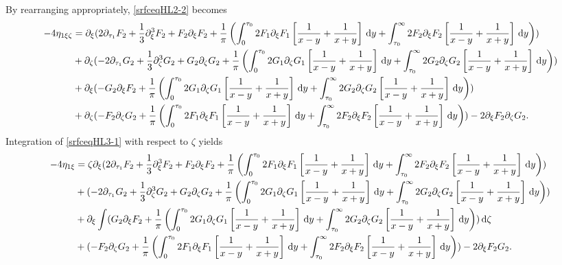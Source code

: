 \documentclass[10pt,reqno,oneside,a4paper, landscape]{article}
\begin{document}
By rearranging appropriately, \eqref{srfceqHL2-2} becomes
\begin{equation}\label{srfceqHL3-2}
\begin{aligned}
- 4\eta_{1\xi \zeta} &= \partial_\xi (2 \partial_{\tau_1}F_2 + \frac{1}{3} \partial_\xi^3 F_2 + F_2\partial_\xi F_2 + \frac{1}{\pi} \left( \int_0^{\tau_0} 2 F_1  \partial_\xi F_1 \left[ \frac{1}{x-y} + \frac{1}{x+y} \right] \,\mathrm{d} y +\int_{\tau_0}^\infty 2 F_2 \partial_\xi F_2\left[ \frac{1}{x-y} + \frac{1}{x+y} \right] \,\mathrm{d} y \right))  \\
&+ \partial_\zeta(- 2 \partial_{\tau_1} G_2 +  \frac{1}{3} \partial_\zeta^3 G_2+ G_2 \partial_{\zeta} G_2 + \frac{1}{\pi} \left( \int_0^{\tau_0}  2 G_1 \partial_\zeta G_1 \left[ \frac{1}{x-y} + \frac{1}{x+y} \right] \,\mathrm{d} y +\int_{\tau_0}^\infty 2 G_2 \partial_\zeta G_2 \left[ \frac{1}{x-y} + \frac{1}{x+y} \right] \,\mathrm{d} y \right)) \\
&+ \partial_{\xi}(-G_2 \partial_\xi F_2 + \frac{1}{\pi} \left( \int_0^{\tau_0} 2 G_1 \partial_\zeta G_1 \left[ \frac{1}{x-y} + \frac{1}{x+y} \right] \,\mathrm{d} y +\int_{\tau_0}^\infty 2 G_2 \partial_\zeta G_2 \left[ \frac{1}{x-y} + \frac{1}{x+y} \right] \,\mathrm{d} y \right) ) \\
&+ \partial_{\zeta}( - F_2\partial_\zeta G_2+ \frac{1}{\pi} \left( \int_0^{\tau_0} 2 F_1  \partial_\xi F_1 \left[ \frac{1}{x-y} + \frac{1}{x+y} \right] \,\mathrm{d} y +\int_{\tau_0}^\infty 2 F_2 \partial_\xi F_2  \left[ \frac{1}{x-y} + \frac{1}{x+y} \right] \,\mathrm{d} y \right)) - 2 \partial_\xi F_2 \partial_\zeta G_2. 
\end{aligned}
\end{equation}
Integration of \eqref{srfceqHL3-1} with respect to $\zeta$ yields
\begin{equation}
\begin{aligned}
- 4\eta_{1\xi} &= \zeta \partial_\xi (2 \partial_{\tau_1}F_2 + \frac{1}{3} \partial_\xi^3 F_2 + F_2\partial_\xi F_2 + \frac{1}{\pi} \left( \int_0^{\tau_0} 2 F_1  \partial_\xi F_1 \left[ \frac{1}{x-y} + \frac{1}{x+y} \right] \,\mathrm{d} y +\int_{\tau_0}^\infty 2 F_2 \partial_\xi F_2\left[ \frac{1}{x-y} + \frac{1}{x+y} \right] \,\mathrm{d} y \right))  \\
&+(- 2 \partial_{\tau_1} G_2 +  \frac{1}{3} \partial_\zeta^3 G_2+ G_2 \partial_{\zeta} G_2  + \frac{1}{\pi} \left( \int_0^{\tau_0}  2 G_1 \partial_\zeta G_1 \left[ \frac{1}{x-y} + \frac{1}{x+y} \right] \,\mathrm{d} y +\int_{\tau_0}^\infty 2 G_2 \partial_\zeta G_2 \left[ \frac{1}{x-y} + \frac{1}{x+y} \right] \,\mathrm{d} y \right)) \\
&+ \partial_{\xi}\int (G_2 \partial_\xi F_2 + \frac{1}{\pi} \left( \int_0^{\tau_0} 2 G_1 \partial_\zeta G_1 \left[ \frac{1}{x-y} + \frac{1}{x+y} \right] \,\mathrm{d} y +\int_{\tau_0}^\infty 2 G_2 \partial_\zeta G_2 \left[ \frac{1}{x-y} + \frac{1}{x+y} \right] \,\mathrm{d} y \right) )\,\mathrm{d} \zeta \\
&+(-F_2\partial_\zeta G_2 + \frac{1}{\pi} \left( \int_0^{\tau_0} 2 F_1  \partial_\xi F_1 \left[ \frac{1}{x-y} + \frac{1}{x+y} \right] \,\mathrm{d} y +\int_{\tau_0}^\infty 2 F_2 \partial_\xi F_2  \left[ \frac{1}{x-y} + \frac{1}{x+y} \right] \,\mathrm{d} y \right)) - 2 \partial_\xi F_2 G_2. 
\end{aligned}
\end{equation}
\end{document}
